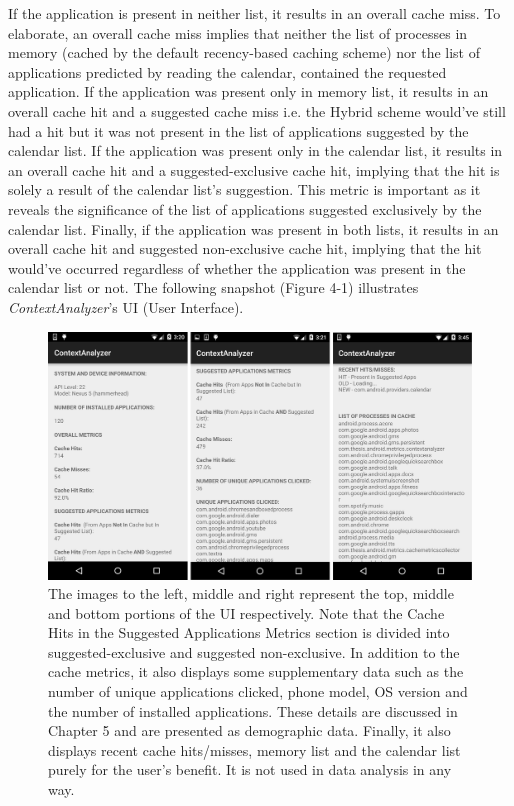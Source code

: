 \documentclass[12pt]{uthesis-v12}  %
\begin{document}
		If the application is present in neither list, it results in an overall cache miss. To elaborate, an overall cache miss implies that neither the list of processes in memory (cached by the default recency-based caching scheme) nor the list of applications predicted by reading the calendar, contained the requested application. If the application was present only in memory list, it results in an overall cache hit and a suggested cache miss i.e. the Hybrid scheme would've still had a hit but it was not present in the list of applications suggested by the calendar list. If the application was present only in the calendar list, it results in an overall cache hit and a suggested-exclusive cache hit, implying that the hit is solely a result of the calendar list's suggestion. This metric is important as it reveals the significance of the list of applications suggested exclusively by the calendar list. Finally, if the application was present in both lists, it results in an overall cache hit and suggested non-exclusive cache hit, implying that the hit would've occurred regardless of whether the application was present in the calendar list or not. The following snapshot (Figure 4-1) illustrates {\em ContextAnalyzer}'s UI (User Interface).  
		
		\begin{figure}[h]
			\centering
			\includegraphics[width = 130mm]{images/contextAnalyzerUI.png}
			\caption[Context Analyzer UI]{The images to the left, middle and right represent the top, middle and bottom portions of the UI respectively. Note that the Cache Hits in the Suggested Applications Metrics section is divided into suggested-exclusive and suggested non-exclusive. In addition to the cache metrics, it also displays some supplementary data such as the number of unique applications clicked, phone model, OS version and the number of installed applications. These details are discussed in Chapter 5 and are presented as demographic data. Finally, it also displays recent cache hits/misses, memory list and the calendar list purely for the user's benefit. It is not used in data analysis in any way.}
		\end{figure}
		
\end{document}

